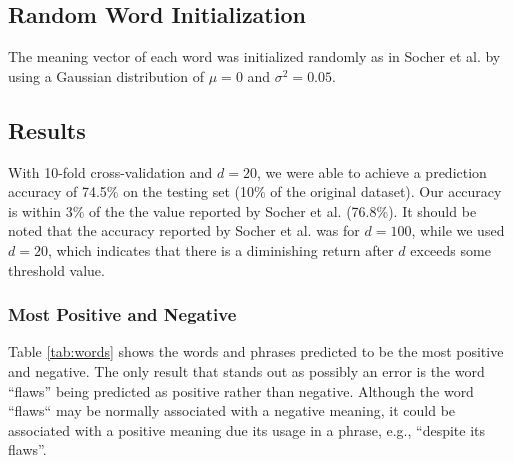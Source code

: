 \documentclass{article}
\begin{document}
%
%
\subsection{Random Word Initialization}
The meaning vector of each word was initialized randomly as in Socher et al. by using a Gaussian distribution of $\mu = 0$ and $\sigma ^2 = 0.05$.


%
%
\subsection{Results}
With 10-fold cross-validation and $d=20$, we were able to achieve a prediction accuracy of 74.5\% on the testing set (10\% of the original dataset). Our accuracy is within 3\% of the the value reported by Socher et al. (76.8\%). It should be noted that the accuracy reported by Socher et al. was for $d=100$, while we used $d=20$, which indicates that there is a diminishing return after $d$ exceeds some threshold value.


\subsubsection{Most Positive and Negative}
Table \ref{tab:words} shows the words and phrases predicted to be the most positive and negative. The only result that stands out as possibly an error is the word ``flaws'' being predicted as positive rather than negative. Although the word ``flaws`` may be normally associated with a negative meaning, it could be associated with a positive meaning due its usage in a phrase, e.g., ``despite its flaws''.
\end{document}
